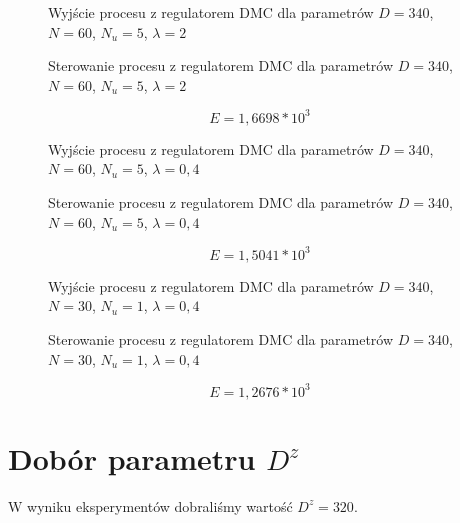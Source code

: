 \begin{figure}[H]
\centering

\caption{Wyjście procesu z regulatorem DMC dla parametrów $D = 340$, $ N = 60$, $N_u = 5$,  $\lambda = 2$}
\end{figure}

\begin{figure}[H]
\centering

\caption{Sterowanie procesu z regulatorem DMC dla parametrów $D = 340$, $ N = 60$, $N_u = 5$,  $\lambda = 2$}
\end{figure}

\begin{equation}
E = 1,6698 * 10^3
\end{equation}

\begin{figure}[H]
\centering

\caption{Wyjście procesu z regulatorem DMC dla parametrów $D = 340$, $ N = 60$, $N_u = 5$,  $\lambda = 0,4$}
\end{figure}

\begin{figure}[H]
\centering

\caption{Sterowanie procesu z regulatorem DMC dla parametrów $D = 340$, $ N = 60$, $N_u = 5$,  $\lambda = 0,4$}
\end{figure}

\begin{equation}
E = 1,5041 * 10^3
\end{equation}

\begin{figure}[H]
\centering

\caption{Wyjście procesu z regulatorem DMC dla parametrów $D = 340$, $ N = 30$, $N_u = 1$,  $\lambda = 0,4$}
\end{figure}

\begin{figure}[H]
\centering

\caption{Sterowanie procesu z regulatorem DMC dla parametrów $D = 340$, $ N = 30$, $N_u = 1$,  $\lambda = 0,4$}
\end{figure}

\begin{equation}
E = 1,2676 * 10^3
\end{equation}

\section{Dobór parametru $D^z$}

W wyniku eksperymentów dobraliśmy wartość $D^z = 320$.

